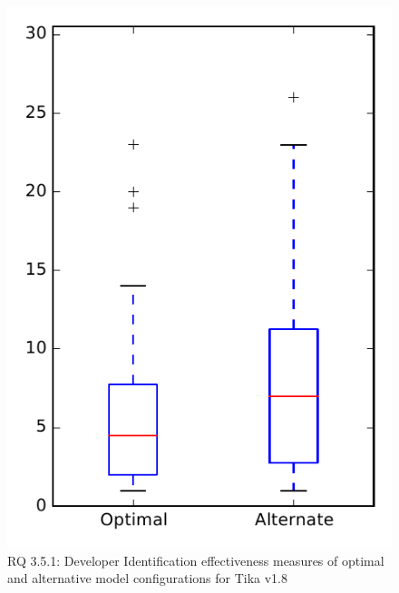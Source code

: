 
\begin{figure}
\centering
\includegraphics[height=0.4\textheight]{figures/combo/dit_rq1_tika}
\caption{RQ 3.5.1: Developer Identification effectiveness measures of optimal and alternative model configurations for Tika v1.8}
\label{fig:combo:dit:rq1:tika}
\end{figure}
